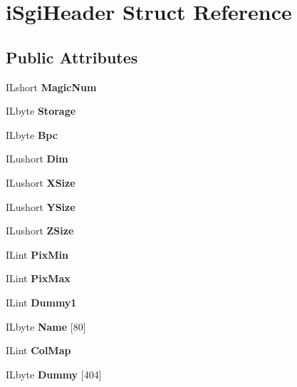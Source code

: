 \hypertarget{structiSgiHeader}{}\section{i\+Sgi\+Header Struct Reference}
\label{structiSgiHeader}
\subsection*{Public Attributes}
\begin{DoxyCompactItemize}
\item 
\mbox{\label{structiSgiHeader_a8f7af3bc4e057e59a433320f3facfc84}} 
I\+Lshort {\bfseries Magic\+Num}
\item 
\mbox{\label{structiSgiHeader_ac0e84a85774d7fcbe112001f0be65744}} 
I\+Lbyte {\bfseries Storage}
\item 
\mbox{\label{structiSgiHeader_a81387165d634c02dc3f4e47c633f3aad}} 
I\+Lbyte {\bfseries Bpc}
\item 
\mbox{\label{structiSgiHeader_ab00caf3cd6f5ea2027f964811b9ec1bc}} 
I\+Lushort {\bfseries Dim}
\item 
\mbox{\label{structiSgiHeader_a3cb82c6006ec0fd90696dc6effdd43e5}} 
I\+Lushort {\bfseries X\+Size}
\item 
\mbox{\label{structiSgiHeader_a93d7f5f51bf2010bf57afe5f176d9cd4}} 
I\+Lushort {\bfseries Y\+Size}
\item 
\mbox{\label{structiSgiHeader_abedfef396ebd243bf319adbcd20ef0ec}} 
I\+Lushort {\bfseries Z\+Size}
\item 
\mbox{\label{structiSgiHeader_ad701282e497ab486b37e7b679003e59b}} 
I\+Lint {\bfseries Pix\+Min}
\item 
\mbox{\label{structiSgiHeader_ade8e8cd7d30bbfeea566d4fba1246cf7}} 
I\+Lint {\bfseries Pix\+Max}
\item 
\mbox{\label{structiSgiHeader_ae72b95e27ac06be52b19eae9a1a93ebc}} 
I\+Lint {\bfseries Dummy1}
\item 
\mbox{\label{structiSgiHeader_a5eecb696c389c1e8dac1e4263c1dbe08}} 
I\+Lbyte {\bfseries Name} \mbox{[}80\mbox{]}
\item 
\mbox{\label{structiSgiHeader_a1af25cb97bec1877b5897325cba9cd99}} 
I\+Lint {\bfseries Col\+Map}
\item 
\mbox{\label{structiSgiHeader_a815aef0c310443d931353eb9c9bb2228}} 
I\+Lbyte {\bfseries Dummy} \mbox{[}404\mbox{]}
\end{DoxyCompactItemize}


